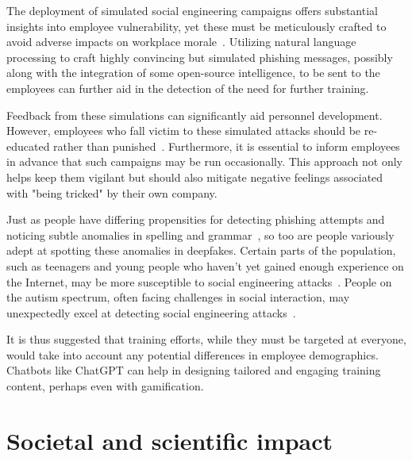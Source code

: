 The deployment of simulated social engineering campaigns offers substantial insights into employee vulnerability, yet these must be meticulously crafted to avoid adverse impacts on workplace morale~\citep{mitnick_The_Art_of_Deception_2003}. Utilizing natural language processing to craft highly convincing but simulated phishing messages, possibly along with the integration of some open-source intelligence, to be sent to the employees can further aid in the detection of the need for further training.

Feedback from these simulations can significantly aid personnel development. However, employees who fall victim to these simulated attacks should be re-educated rather than punished~\citep{mitnick_The_Art_of_Deception_2003}. Furthermore, it is essential to inform employees in advance that such campaigns may be run occasionally. This approach not only helps keep them vigilant but should also mitigate negative feelings associated with "being tricked" by their own company.

%
%
Just as people have differing propensities for detecting phishing attempts and noticing subtle anomalies in spelling and grammar~\citep{nicholson_Investigating_Teenagers_Detect_Phishing_2020, neupane_Social_Disorders_Facilitate_SE_2018}, so too are people variously adept at spotting these anomalies in deepfakes. Certain parts of the population, such as teenagers and young people who haven't yet gained enough experience on the Internet, may be more susceptible to social engineering attacks~\citep{nicholson_Investigating_Teenagers_Detect_Phishing_2020}. People on the autism spectrum, often facing challenges in social interaction, may unexpectedly excel at detecting social engineering attacks~\citep{neupane_Social_Disorders_Facilitate_SE_2018}.

It is thus suggested that training efforts, while they must be targeted at everyone, would take into account any potential differences in employee demographics. Chatbots like ChatGPT can help in designing tailored and engaging training content, perhaps even with gamification.





\section{Societal and scientific impact}
\begin{comment}
\end{comment}


